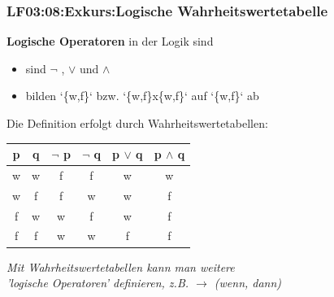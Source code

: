\begin{frame}[fragile]  
  \frametitle{LF03:08:Exkurs:Logische Wahrheitswertetabelle}
  \vspace{0.2cm}

  \begin{small}
  \textbf{Logische Operatoren} in der Logik sind 
  \begin{itemize}
    \item sind \texttt{$\neg$} , \texttt{$\lor$} und \texttt{$\land$} 
    \item bilden `\{w,f\}` bzw. `\{w,f\}x\{w,f\}` auf `\{w,f\}` ab
  \end{itemize}
    
  \vspace{0.2cm}

Die Definition erfolgt durch Wahrheitswertetabellen:

  \begin{center}

      \renewcommand{\arraystretch}{1.3}
\begin{tabular}{c|c|c|c|c|c|}
p & q & $\neg$ p & $\neg$ q & p $\lor$ q & p $\land$ q \\
\hline
w & w & f & f & w & w \\
w & f & f & w & w & f \\
f & w & w & f & w & f \\
f & f & w & w & f & f 
\end{tabular}
    \end{center}
  \end{small}
  
  \vspace{0.5cm}
\begin{footnotesize}
    \begin{flushright}
      \textit{Mit Wahrheitswertetabellen kann man weitere \\
      'logische Operatoren' definieren, z.B. $\to$ (wenn, dann)}
    \end{flushright}
  \end{footnotesize}

\end{frame}


